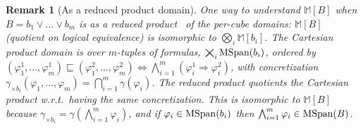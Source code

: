 \documentclass[acmsmall,screen]{acmart}
\newtheorem{remark}[theo]{Remark}
\renewcommand{\implies}{\Longrightarrow}
\newcommand{\sleq}{\sqsubseteq}
\newcommand{\mspan}[1]{{\rm MSpan}({#1})}
\newcommand{\madom}[1]{\mathbb{M}[{#1}]}
\newcommand{\bkcube}{b}
\begin{document}
\begin{remark}[As a reduced product domain]
%
One way to understand $\madom{B}$ when $B = \bkcube_1 \lor \ldots \lor \bkcube_m$ is as a reduced product~\cite{POPL:CC79} of the per-cube domains: $\madom{B}$ (quotient on logical equivalence) is isomorphic to $\bigotimes_{i}{\madom{\bkcube_i}}$.
The Cartesian product domain is over $m$-tuples of formulas, $\bigtimes_{i}{\mspan{\bkcube_i}}$, ordered by $(\varphi^1_1,\ldots,\varphi^1_m) \sleq (\varphi^2_1,\ldots,\varphi^2_m) \iff \bigwedge_{i=1}^{m}{(\varphi^1_i \implies \varphi^2_i)}$, with concretization $\gamma_{\times \bkcube_i}(\varphi_1,\ldots,\varphi_m)=\bigcap_{i=1}^{m}{\gamma(\varphi_i)}$.
The reduced product quotients the Cartesian product w.r.t.\ having the same concretization.
This is isomorphic to $\madom{B}$ because $\gamma_{\times \bkcube_i} = \gamma(\bigwedge_{i=1}^{m}{\varphi_i})$, and if $\varphi_i \in \mspan{\bkcube_i}$ then $\bigwedge_{i=1}^{m}{\varphi_i} \in \mspan{B}$.
%
%
\end{remark}
\end{document}
